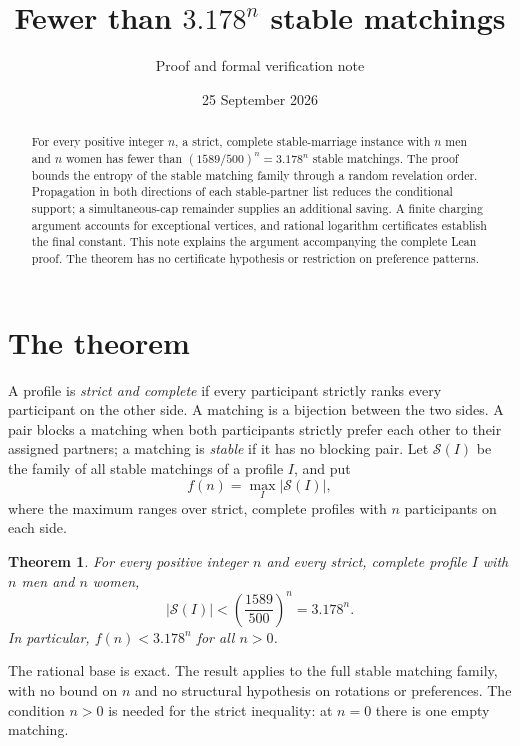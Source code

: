 \documentclass[11pt,letterpaper]{article}
\title{Fewer than \(3.178^n\) stable matchings}
\author{\normalsize Proof and formal verification note}
\date{\small 25 September 2026}
\newtheorem{theorem}{Theorem}
\theoremstyle{remark}
\newcommand{\cS}{\mathcal{S}}
\numberwithin{equation}{section}
\begin{document}
\maketitle

\begin{abstract}
For every positive integer \(n\), a strict, complete stable-marriage
instance with \(n\) men and \(n\) women has fewer than
\((1589/500)^n=3.178^n\) stable matchings. The proof bounds the entropy
of the stable matching family through a random revelation order.
Propagation in both directions of each stable-partner list reduces
the conditional support; a simultaneous-cap remainder supplies an
additional saving. A finite charging argument accounts for exceptional
vertices, and rational logarithm certificates establish the final
constant. This note explains the argument accompanying the complete
Lean proof. The theorem has no certificate hypothesis or restriction
on preference patterns.
\end{abstract}

\section{The theorem}
\label{sec:theorem}

A profile is \emph{strict and complete} if every participant strictly
ranks every participant on the other side. A matching is a bijection
between the two sides. A pair blocks a matching when both participants
strictly prefer each other to their assigned partners; a matching is
\emph{stable} if it has no blocking pair. Let \(\cS(I)\) be the family
of all stable matchings of a profile \(I\), and put
\[
  f(n)=\max_I |\cS(I)|,
\]
where the maximum ranges over strict, complete profiles with \(n\)
participants on each side.

\begin{theorem}\label{thm:main}
For every positive integer \(n\) and every strict, complete profile
\(I\) with \(n\) men and \(n\) women,
\begin{equation}\label{eq:main}
  |\cS(I)| < \left(\frac{1589}{500}\right)^n = 3.178^n.
\end{equation}
In particular, \(f(n)<3.178^n\) for all \(n>0\).
\end{theorem}

The rational base is exact. The result applies to the full stable
matching family, with no bound on \(n\) and no structural hypothesis
on rotations or preferences. The condition \(n>0\) is needed for the
strict inequality: at \(n=0\) there is one empty matching.
\end{document}
